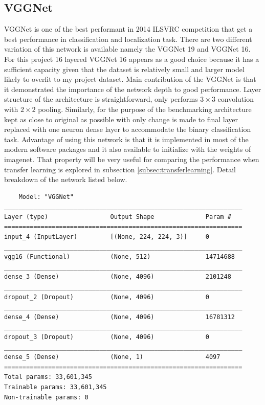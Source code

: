\subsection{VGGNet}
VGGNet is one of the best performant in 2014 ILSVRC competition that get a best performance in classification and localization task.
There are two different variation of this network is available namely the VGGNet 19 and VGGNet 16. 
For this project 16 layered VGGNet 16 appears as a good choice because it has a sufficient capacity given that the dataset is relatively small and larger model likely to overfit to my project dataset.
Main contribution of the VGGNet is that it demonstrated the importance of the network depth to good performance.
Layer structure of the architecture is straightforward, only performs $3 \times 3$ convolution with $2 \times 2$ pooling.
Similarly, for the purpose of the benchmarking architecture kept as close to original as possible with only change is made to final layer replaced with one neuron dense layer to accommodate the binary classification task.
Advantage of using this network is that it is implemented in most of the modern software packages and it also available to initialize with the weights of imagenet. 
That property will be very useful for comparing the performance when transfer learning is explored in subsection \ref{subsec:transferlearning}.
Detail breakdown of the network listed below.

\begin{verbatim}
    Model: "VGGNet"
_________________________________________________________________
Layer (type)                 Output Shape              Param #   
=================================================================
input_4 (InputLayer)         [(None, 224, 224, 3)]     0         
_________________________________________________________________
vgg16 (Functional)           (None, 512)               14714688  
_________________________________________________________________
dense_3 (Dense)              (None, 4096)              2101248   
_________________________________________________________________
dropout_2 (Dropout)          (None, 4096)              0         
_________________________________________________________________
dense_4 (Dense)              (None, 4096)              16781312  
_________________________________________________________________
dropout_3 (Dropout)          (None, 4096)              0         
_________________________________________________________________
dense_5 (Dense)              (None, 1)                 4097      
=================================================================
Total params: 33,601,345
Trainable params: 33,601,345
Non-trainable params: 0

\end{verbatim}

